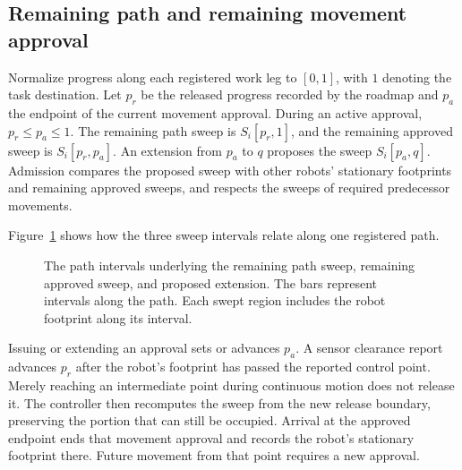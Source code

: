 \documentclass[11pt,a4paper]{article}
\begin{document}
\subsection{Remaining path and remaining movement approval}
\label{sec:remaining-movement-approval}
Normalize progress along each registered work leg to $[0,1]$, with $1$
denoting the task destination. Let $p_r$ be the released progress recorded
by the roadmap and $p_a$ the endpoint of the current movement approval.
During an active approval, $p_r\le p_a\le 1$. The remaining path sweep is
$S_i[p_r,1]$, and the remaining approved sweep is $S_i[p_r,p_a]$.
An extension from $p_a$ to $q$ proposes the sweep $S_i[p_a,q]$.
Admission compares the proposed sweep with other robots' stationary
footprints and remaining approved sweeps, and respects the sweeps of
required predecessor movements.

Figure~\ref{fig:remaining-approval} shows how the three sweep intervals
relate along one registered path.

\begin{figure}[H]
\centering
{}
\caption{The path intervals underlying the remaining path sweep,
remaining approved sweep, and proposed extension. The bars represent
intervals along the path. Each swept region includes the robot footprint
along its interval.}
\label{fig:remaining-approval}
\end{figure}

Issuing or extending an approval sets or advances $p_a$. A sensor
clearance report advances $p_r$ after the robot's footprint has passed the
reported control point. Merely reaching an intermediate point during
continuous motion does not release it. The controller then recomputes the
sweep from the new release boundary, preserving the portion that can
still be occupied. Arrival at the approved endpoint ends that movement
approval and records the robot's stationary footprint there. Future
movement from that point requires a new approval.
\end{document}
